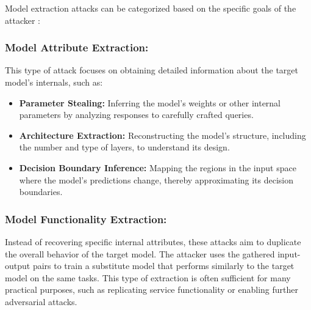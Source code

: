 \documentclass[conference]{IEEEtran}
\begin{document}
Model extraction attacks can be categorized based on the specific goals of the attacker \cite{gong2020model}:

\subsubsection{Model Attribute Extraction:}
This type of attack focuses on obtaining detailed information about the target model's internals, such as:
\begin{itemize}
  \item \textbf{Parameter Stealing:} Inferring the model's weights or other internal parameters by analyzing responses to carefully crafted queries.
  \item \textbf{Architecture Extraction:} Reconstructing the model’s structure, including the number and type of layers, to understand its design.
  \item \textbf{Decision Boundary Inference:} Mapping the regions in the input space where the model’s predictions change, thereby approximating its decision boundaries.
\end{itemize}

\subsubsection{Model Functionality Extraction:}
Instead of recovering specific internal attributes, these attacks aim to duplicate the overall behavior of the target model. The attacker uses the gathered input-output pairs to train a substitute model that performs similarly to the target model on the same tasks. This type of extraction is often sufficient for many practical purposes, such as replicating service functionality or enabling further adversarial attacks.

\end{document}
